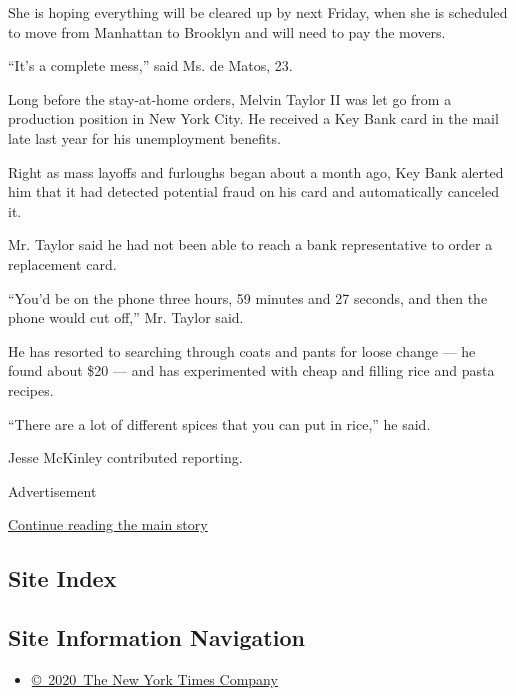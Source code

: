 She is hoping everything will be cleared up by next Friday, when she is
scheduled to move from Manhattan to Brooklyn and will need to pay the
movers.

``It's a complete mess,'' said Ms. de Matos, 23.

Long before the stay-at-home orders, Melvin Taylor II was let go from a
production position in New York City. He received a Key Bank card in the
mail late last year for his unemployment benefits.

Right as mass layoffs and furloughs began about a month ago, Key Bank
alerted him that it had detected potential fraud on his card and
automatically canceled it.

Mr. Taylor said he had not been able to reach a bank representative to
order a replacement card.

``You'd be on the phone three hours, 59 minutes and 27 seconds, and then
the phone would cut off,'' Mr. Taylor said.

He has resorted to searching through coats and pants for loose change
--- he found about \$20 --- and has experimented with cheap and filling
rice and pasta recipes.

``There are a lot of different spices that you can put in rice,'' he
said.

Jesse McKinley contributed reporting.

Advertisement

\protect\hyperlink{after-bottom}{Continue reading the main story}

\hypertarget{site-index}{%
\subsection{Site Index}\label{site-index}}

\hypertarget{site-information-navigation}{%
\subsection{Site Information
Navigation}\label{site-information-navigation}}

\begin{itemize}
\tightlist
\item
  \href{https://help.nytimes3xbfgragh.onion/hc/en-us/articles/115014792127-Copyright-notice}{©~2020~The
  New York Times Company}
\end{itemize}

